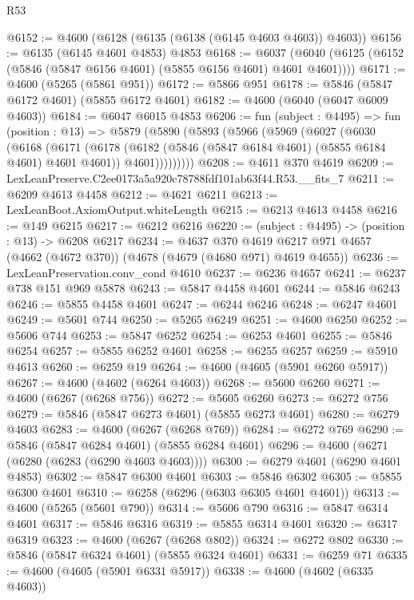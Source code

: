 \begin{lexlean}{R53}
\begin{coremodule}
@6152 := @4600 (@6128 (@6135 (@6138 (@6145 @4603 @4603)) @4603))
@6156 := @6135 (@6145 @4601 @4853) @4853
@6168 := @6037 (@6040 (@6125 (@6152 (@5846 (@5847 @6156 @4601) (@5855 @6156 @4601) @4601 @4601))))
@6171 := @4600 (@5265 (@5861 @951))
@6172 := @5866 @951
@6178 := @5846 (@5847 @6172 @4601) (@5855 @6172 @4601)
@6182 := @4600 (@6040 (@6047 @6009 @4603))
@6184 := @6047 @6015 @4853
@6206 := fun (subject : @4495) =>
  fun (position : @13) =>
  @5879
    (@5890
      (@5893
        (@5966
          (@5969
            (@6027
              (@6030
                (@6168
                  (@6171
                    (@6178
                      (@6182 (@5846 (@5847 @6184 @4601) (@5855 @6184 @4601) @4601 @4601))
                      @4601)))))))))
@6208 := @4611 @370 @4619
@6209 := LexLeanPreserve.C2ee0173a5a920c78788fdf101ab63f44.R53.__fits_7
@6211 := @6209 @4613 @4458
@6212 := @4621 @6211
@6213 := LexLeanBoot.AxiomOutput.whiteLength
@6215 := @6213 @4613 @4458
@6216 := @149 @6215
@6217 := @6212 @6216
@6220 := (subject : @4495) -> (position : @13) -> @6208 @6217
@6234 := @4637
    @370
    @4619
    @6217
    @971
    @4657
    (@4662 (@4672 @370))
    (@4678 (@4679 (@4680 @971) @4619 @4655))
@6236 := LexLeanPreservation.conv_cond @4610
@6237 := @6236 @4657
@6241 := @6237 @738 @151 @969 @5878
@6243 := @5847 @4458 @4601
@6244 := @5846 @6243
@6246 := @5855 @4458 @4601
@6247 := @6244 @6246
@6248 := @6247 @4601
@6249 := @5601 @744
@6250 := @5265 @6249
@6251 := @4600 @6250
@6252 := @5606 @744
@6253 := @5847 @6252
@6254 := @6253 @4601
@6255 := @5846 @6254
@6257 := @5855 @6252 @4601
@6258 := @6255 @6257
@6259 := @5910 @4613
@6260 := @6259 @19
@6264 := @4600 (@4605 (@5901 @6260 @5917))
@6267 := @4600 (@4602 (@6264 @4603))
@6268 := @5600 @6260
@6271 := @4600 (@6267 (@6268 @756))
@6272 := @5605 @6260
@6273 := @6272 @756
@6279 := @5846 (@5847 @6273 @4601) (@5855 @6273 @4601)
@6280 := @6279 @4603
@6283 := @4600 (@6267 (@6268 @769))
@6284 := @6272 @769
@6290 := @5846 (@5847 @6284 @4601) (@5855 @6284 @4601)
@6296 := @4600 (@6271 (@6280 (@6283 (@6290 @4603 @4603))))
@6300 := @6279 @4601 (@6290 @4601 @4853)
@6302 := @5847 @6300 @4601
@6303 := @5846 @6302
@6305 := @5855 @6300 @4601
@6310 := @6258 (@6296 (@6303 @6305 @4601 @4601))
@6313 := @4600 (@5265 (@5601 @790))
@6314 := @5606 @790
@6316 := @5847 @6314 @4601
@6317 := @5846 @6316
@6319 := @5855 @6314 @4601
@6320 := @6317 @6319
@6323 := @4600 (@6267 (@6268 @802))
@6324 := @6272 @802
@6330 := @5846 (@5847 @6324 @4601) (@5855 @6324 @4601)
@6331 := @6259 @71
@6335 := @4600 (@4605 (@5901 @6331 @5917))
@6338 := @4600 (@4602 (@6335 @4603))

\end{coremodule}
\end{lexlean}
